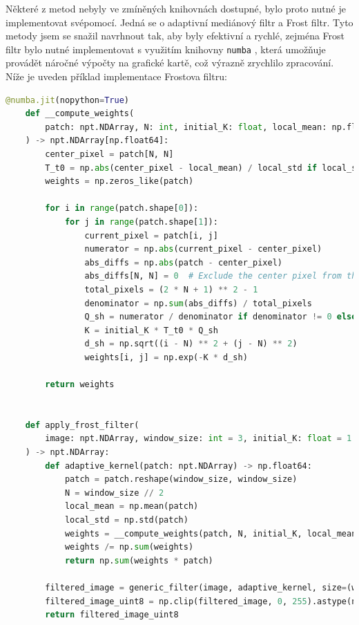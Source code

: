 \documentclass[male,czech,api_ing]{thesis}
\begin{document}
Některé z metod nebyly ve zmíněných knihovnách dostupné, bylo proto nutné je implementovat svépomocí. Jedná se o adaptivní mediánový filtr a Frost filtr. Tyto metody jsem se snažil navrhnout tak, aby byly efektivní a rychlé, zejména Frost filtr bylo nutné implementovat s využitím knihovny \texttt{numba} \cite{numba}, která umožňuje provádět náročné výpočty na grafické kartě, což výrazně zrychlilo zpracování. Níže je uveden příklad implementace Frostova filtru:

\begin{lstlisting}[language=Python, caption={Implementace Frost filtru s využitím Numba CUDA}, label={lst:frost_filter}]
    @numba.jit(nopython=True)
    def __compute_weights(
        patch: npt.NDArray, N: int, initial_K: float, local_mean: np.float64, local_std: np.float64
    ) -> npt.NDArray[np.float64]:
        center_pixel = patch[N, N]
        T_t0 = np.abs(center_pixel - local_mean) / local_std if local_std != 0 else 0
        weights = np.zeros_like(patch)
    
        for i in range(patch.shape[0]):
            for j in range(patch.shape[1]):
                current_pixel = patch[i, j]
                numerator = np.abs(current_pixel - center_pixel)
                abs_diffs = np.abs(patch - center_pixel)
                abs_diffs[N, N] = 0  # Exclude the center pixel from the sum
                total_pixels = (2 * N + 1) ** 2 - 1
                denominator = np.sum(abs_diffs) / total_pixels
                Q_sh = numerator / denominator if denominator != 0 else 0
                K = initial_K * T_t0 * Q_sh
                d_sh = np.sqrt((i - N) ** 2 + (j - N) ** 2)
                weights[i, j] = np.exp(-K * d_sh)
        
        return weights
    
    
    def apply_frost_filter(
        image: npt.NDArray, window_size: int = 3, initial_K: float = 1.0
    ) -> npt.NDArray:
        def adaptive_kernel(patch: npt.NDArray) -> np.float64:
            patch = patch.reshape(window_size, window_size)
            N = window_size // 2
            local_mean = np.mean(patch)
            local_std = np.std(patch)
            weights = __compute_weights(patch, N, initial_K, local_mean, local_std)
            weights /= np.sum(weights)
            return np.sum(weights * patch)
    
        filtered_image = generic_filter(image, adaptive_kernel, size=(window_size, window_size))
        filtered_image_uint8 = np.clip(filtered_image, 0, 255).astype(np.uint8)
        return filtered_image_uint8
\end{lstlisting}
\end{document}
